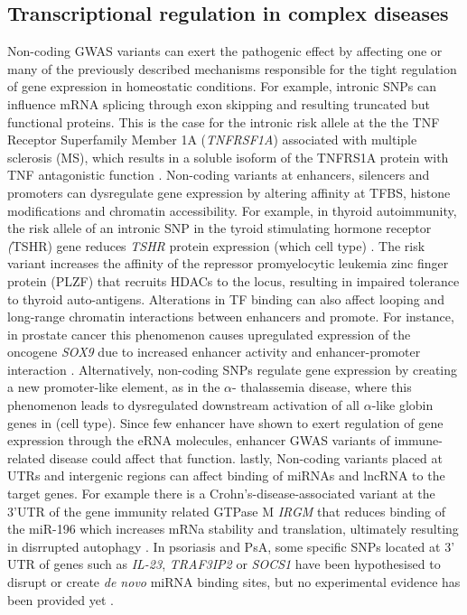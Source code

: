 \subsection{Transcriptional regulation in complex diseases}
Non-coding GWAS variants can exert the pathogenic effect by affecting one or many of the previously described mechanisms responsible for the tight regulation of gene expression in homeostatic conditions. For example, intronic SNPs can influence mRNA splicing through exon skipping and resulting truncated but functional proteins. This is the case for the intronic risk allele at the the TNF Receptor Superfamily Member 1A (\textit{TNFRSF1A}) associated with multiple sclerosis (MS), which results in a soluble isoform of the TNFRS1A protein with TNF antagonistic function \parencite{Gregory2012}. Non-coding variants at enhancers, silencers and promoters can dysregulate gene expression by altering affinity at TFBS, histone modifications and chromatin accessibility. For example, in thyroid autoimmunity, the risk allele of an intronic SNP in the tyroid stimulating hormone receptor \textit(TSHR) gene reduces \textit{TSHR} protein expression (which cell type) \parencite{Stefan2014}. The risk variant increases the affinity of the repressor promyelocytic leukemia zinc finger protein (PLZF) that recruits HDACs to the locus, resulting in impaired tolerance to thyroid auto-antigens. Alterations in TF binding can also affect looping and long-range chromatin interactions between enhancers and promote. For instance, in prostate cancer this phenomenon causes upregulated expression of the oncogene \textit{SOX9} due to increased enhancer activity and enhancer-promoter interaction \parencite{Zhang2012}. 
Alternatively, non-coding SNPs regulate gene expression by creating a new promoter-like element, as in the $\alpha$- thalassemia disease, where this phenomenon leads to dysregulated downstream activation of all $\alpha$-like globin genes in (cell type)\parencite{Gobbi2006}. Since few enhancer have shown to exert regulation of gene expression through the eRNA molecules, enhancer GWAS variants of immune-related disease could affect that function\parencite{Shechner2015,Fahr2014}. lastly, Non-coding variants placed at UTRs and intergenic regions can affect binding of miRNAs and lncRNA to the target genes. For example  there is a Crohn’s-disease-associated variant at the 3'UTR of the gene immunity related GTPase M \textit{IRGM} that reduces binding of the miR-196 which increases mRNa stability and translation, ultimately resulting in disrrupted autophagy  \parencite{Brest2011}. In psoriasis and PsA, some specific SNPs located at 3' UTR of genes such as \textit{IL-23}, \textit{TRAF3IP2} or \textit{SOCS1} have been hypothesised to disrupt or create \textit{de novo} miRNA binding sites, but no experimental evidence has been provided yet \parencite{Pivarcsi2014}. 





